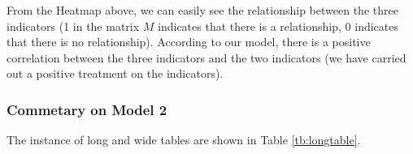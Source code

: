 \documentclass[12pt]{article}  %
\begin{document}
From the Heatmap above, we can easily see the relationship between the three indicators (1 in the matrix $M$ indicates that there is a relationship, 0 indicates that there is no relationship). According to our model, there is a positive correlation between the three indicators and the two indicators (we have carried out a positive treatment on the indicators).






























\newpage







\clearpage
\subsubsection{Commetary on Model 2}
The instance of long and wide tables are shown in Table \ref{tb:longtable}.
\end{document}
